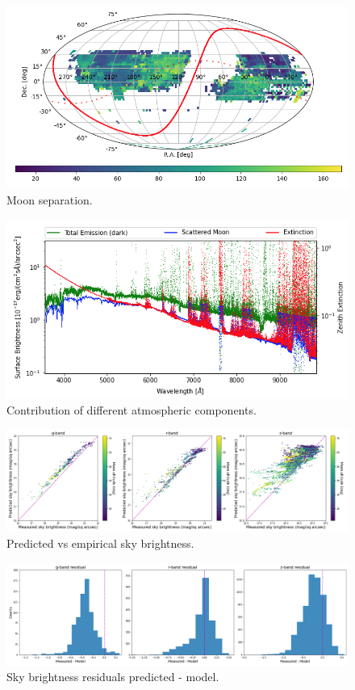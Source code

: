 \begin{figure}[h]
\centering
\includegraphics[width=16cm]{images/specsim/moon_separation_binned.png}
\caption{Moon separation.}
\label{fig:moon_sep}
\end{figure}

\begin{figure}[h]
\centering
\includegraphics[width=16cm]{images/specsim/atmosphere_am_1.38_moon_zenith_63.28_sep_angle_53.24_moon_phase_0.45.png}
\caption{Contribution of different atmospheric components.}
\label{fig:atm_components}
\end{figure}

\begin{figure}[h]
\centering
\includegraphics[width=18cm]{images/specsim/moon_brightness.png}
\caption{Predicted vs empirical sky brightness.}
\label{fig:sb_comparison}
\end{figure}

\begin{figure}[h]
\centering
\includegraphics[width=16cm]{images/specsim/sky_brightness_residuals.png}
\caption{Sky brightness residuals predicted - model.}
\label{fig:sb_res}
\end{figure}


